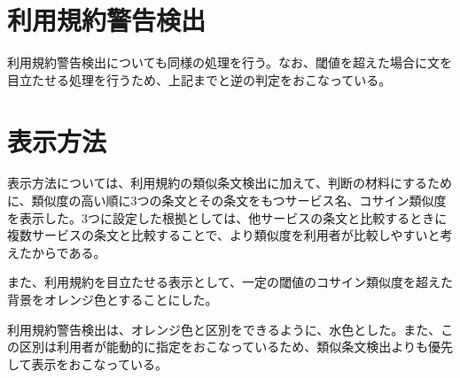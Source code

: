\section{利用規約警告検出}
利用規約警告検出についても同様の処理を行う。なお、閾値を超えた場合に文を目立たせる処理を行うため、上記までと逆の判定をおこなっている。

\section{表示方法}
表示方法については、利用規約の類似条文検出に加えて、判断の材料にするために、類似度の高い順に3つの条文とその条文をもつサービス名、コサイン類似度を表示した。3つに設定した根拠としては、他サービスの条文と比較するときに複数サービスの条文と比較することで、より類似度を利用者が比較しやすいと考えたからである。

また、利用規約を目立たせる表示として、一定の閾値のコサイン類似度を超えた背景をオレンジ色とすることにした。

利用規約警告検出は、オレンジ色と区別をできるように、水色とした。また、この区別は利用者が能動的に指定をおこなっているため、類似条文検出よりも優先して表示をおこなっている。

